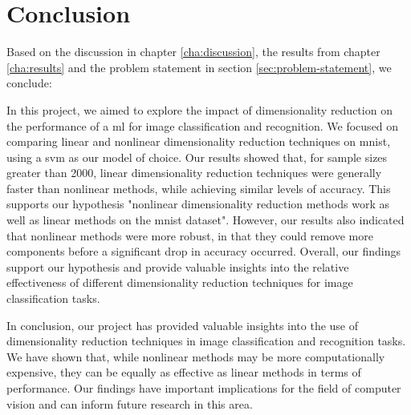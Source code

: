 \chapter{Conclusion}\label{cha:conclusion}
Based on the discussion in chapter \ref{cha:discussion}, the results from chapter \ref{cha:results} and the problem statement in section \ref{sec:problem-statement}, we conclude:


In this project, we aimed to explore the impact of dimensionality reduction on the performance of a \gls{ml} for image classification and recognition. We focused on comparing linear and nonlinear dimensionality reduction techniques on \gls{mnist}, using a \gls{svm} as our model of choice. Our results showed that, for sample sizes greater than 2000, linear dimensionality reduction techniques were generally faster than nonlinear methods, while achieving similar levels of accuracy. This supports our hypothesis "nonlinear dimensionality reduction methods work as well as linear methods on the \gls{mnist} dataset". However, our results also indicated that nonlinear methods were more robust, in that they could remove more components before a significant drop in accuracy occurred. Overall, our findings support our hypothesis and provide valuable insights into the relative effectiveness of different dimensionality reduction techniques for image classification tasks.

In conclusion, our project has provided valuable insights into the use of dimensionality reduction techniques in image classification and recognition tasks. We have shown that, while nonlinear methods may be more computationally expensive, they can be equally as effective as linear methods in terms of performance. Our findings have important implications for the field of computer vision and can inform future research in this area.


